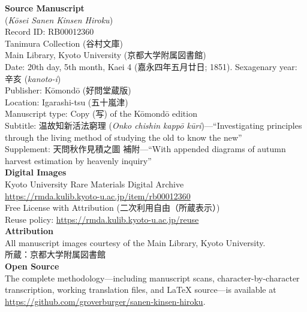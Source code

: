 \documentclass[10pt, openany]{book}
\newcommand{\jp}[1]{{\japanesefont #1}}
\begin{document}
\begin{small}
\noindent\textbf{Source Manuscript}\\[0.3em]
\noindent\jp{校正三猿金泉秘録} (\textit{K\=osei Sanen Kinsen Hiroku})\\
Record ID: RB00012360\\
Tanimura Collection (\jp{谷村文庫})\\
Main Library, Kyoto University (\jp{京都大学附属図書館})\\[0.5em]
Date: 20th day, 5th month, Kaei 4 (\jp{嘉永四年五月廿日}; 1851).
Sexagenary year: \jp{辛亥} (\textit{kanoto-i})\\
Publisher: K\=omond\=o (\jp{好問堂蔵版})\\
Location: Igarashi-tsu (\jp{五十嵐津})\\
Manuscript type: Copy (\jp{写}) of the K\=omond\=o edition\\
Subtitle: \jp{温故知新活法窮理} (\textit{Onko chishin kapp\=o
k\=uri})---``Investigating principles through the living method of
studying the old to know the new''\\
Supplement: \jp{天問秋作見積之圖 補附}---``With appended diagrams of
autumn harvest estimation by heavenly inquiry''\\[1em]

\noindent\textbf{Digital Images}\\[0.3em]
\noindent Kyoto University Rare Materials Digital Archive\\
\url{https://rmda.kulib.kyoto-u.ac.jp/item/rb00012360}\\[0.5em]
Free License with Attribution (\jp{二次利用自由（所蔵表示）})\\
Reuse policy: \url{https://rmda.kulib.kyoto-u.ac.jp/reuse}\\[1em]

\noindent\textbf{Attribution}\\[0.3em]
\noindent All manuscript images courtesy of the Main Library, Kyoto University.\\
\jp{所蔵：京都大学附属図書館}\\[1em]

\noindent\textbf{Open Source}\\[0.3em]
\noindent The complete methodology---including manuscript scans,
character-by-character transcription, working translation files, and
\LaTeX{} source---is available at
\url{https://github.com/groverburger/sanen-kinsen-hiroku}.
\end{small}
\newpage

\thispagestyle{empty}
~\vfill
\end{document}

